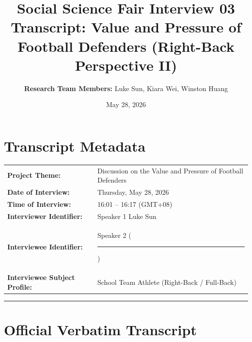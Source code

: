 \documentclass[11pt,a4paper]{article}
\title{\textbf{Social Science Fair Interview 03 \\ Transcript: Value and Pressure of Football Defenders (Right-Back Perspective II)}}
\author{\textbf{Research Team Members:} Luke Sun, Kiara Wei, Winston Huang}
\date{May 28, 2026}
\newcommand{\redacted}{\rule{2.5cm}{2ex}}
\begin{document}
\maketitle

\section*{Transcript Metadata}
\begin{tabular}{ll}
    \textbf{Project Theme:} & Discussion on the Value and Pressure of Football Defenders \\
    \textbf{Date of Interview:} & Thursday, May 28, 2026 \\
    \textbf{Time of Interview:} & 16:01 -- 16:17 (GMT+08) \\
    \textbf{Interviewer Identifier:} & Speaker 1 Luke Sun\\
    \textbf{Interviewee Identifier:} & Speaker 2 (\redacted) \\
    \textbf{Interviewee Subject Profile:} & School Team Athlete (Right-Back / Full-Back)
\end{tabular}

\vspace{2em}
\hrule
\vspace{1.5em}

\section*{Official Verbatim Transcript}
\end{document}
